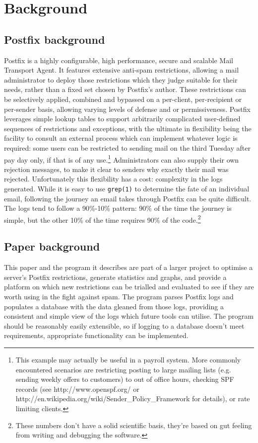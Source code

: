 \documentclass[a4paper,12pt,draft]{article}
\begin{document}
\section{Background}

\subsection{Postfix background}

Postfix is a highly configurable, high performance, secure and scalable
Mail Transport Agent.  It features extensive anti-spam restrictions,
allowing a mail administrator to deploy those restrictions which they judge
suitable for their needs, rather than a fixed set chosen by Postfix's
author.  These restrictions can be selectively applied, combined and
bypassed on a per-client, per-recipient or per-sender basis, allowing
varying levels of defense and or permissiveness.  Postfix leverages simple
lookup tables to support arbitrarily complicated user-defined sequences of
restrictions and exceptions, with the ultimate in flexibility being the
facility to consult an external process which can implement whatever logic
is required: some users can be restricted to sending mail on the third
Tuesday after pay day only, if that is of any use.\footnote{This example
may actually be useful in a payroll system.  More commonly encountered
scenarios are restricting posting to large mailing lists (e.g. sending
weekly offers to customers) to out of office hours, checking SPF records
(see http://www.openspf.org/ or
http://en.wikipedia.org/wiki/Sender\_Policy\_Framework for details), or
rate limiting clients.}  Administrators can also supply their own rejection
messages, to make it clear to senders why exactly their mail was rejected.
Unfortunately this flexibility has a cost: complexity in the logs
generated.  While it is easy to use \texttt{grep(1)} to determine the fate
of an individual email, following the journey an email takes through
Postfix can be quite difficult.  The logs tend to follow a 90\%-10\%
pattern: 90\% of the time the journey is simple, but the other 10\% of the
time requires 90\% of the code.\footnote{These numbers don't have a solid
scientific basis, they're based on gut feeling from writing and debugging
the software.}

\subsection{Paper background}

This paper and the program it describes are part of a larger project to
optimise a server's Postfix restrictions, generate statistics and graphs,
and provide a platform on which new restrictions can be trialled and
evaluated to see if they are worth using in the fight against spam.  The
program parses Postfix logs and populates a database with the data gleaned
from those logs, providing a consistent and simple view of the logs which
future tools can utilise.  The program should be reasonably easily
extensible, so if logging to a database doesn't meet requirements,
appropriate functionality can be implemented.
\end{document}
